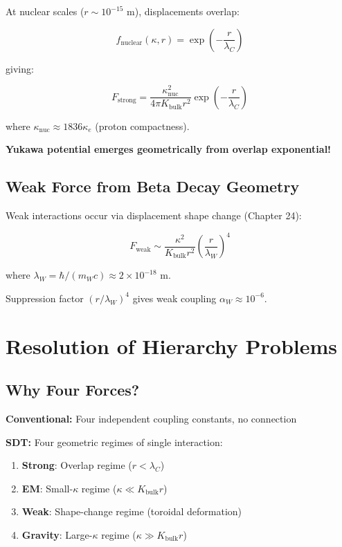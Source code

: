At nuclear scales ($r \sim 10^{-15}$ m), displacements overlap:

\begin{equation}
f_{\text{nuclear}}(\kappa, r) = \exp\left(-\frac{r}{\lambda_C}\right)
\end{equation}

giving:

\begin{equation}
F_{\text{strong}} = \frac{\kappa_{\text{nuc}}^2}{4\pi K_{\text{bulk}} r^2} \exp\left(-\frac{r}{\lambda_C}\right)
\end{equation}

where $\kappa_{\text{nuc}} \approx 1836 \kappa_e$ (proton compactness).

\textbf{Yukawa potential emerges geometrically from overlap exponential!}

\subsection{Weak Force from Beta Decay Geometry}

Weak interactions occur via displacement shape change (Chapter 24):

\begin{equation}
F_{\text{weak}} \sim \frac{\kappa^2}{K_{\text{bulk}} r^2} \left(\frac{r}{\lambda_W}\right)^4
\end{equation}

where $\lambda_W = \hbar/(m_W c) \approx 2 \times 10^{-18}$ m.

Suppression factor $(r/\lambda_W)^4$ gives weak coupling $\alpha_W \approx 10^{-6}$.

\section{Resolution of Hierarchy Problems}

\subsection{Why Four Forces?}

\textbf{Conventional:} Four independent coupling constants, no connection

\textbf{SDT:} Four geometric regimes of single interaction:

\begin{enumerate}
\item \textbf{Strong}: Overlap regime ($r < \lambda_C$)
\item \textbf{EM}: Small-$\kappa$ regime ($\kappa \ll K_{\text{bulk}} r$)
\item \textbf{Weak}: Shape-change regime (toroidal deformation)
\item \textbf{Gravity}: Large-$\kappa$ regime ($\kappa \gg K_{\text{bulk}} r$)
\end{enumerate}

